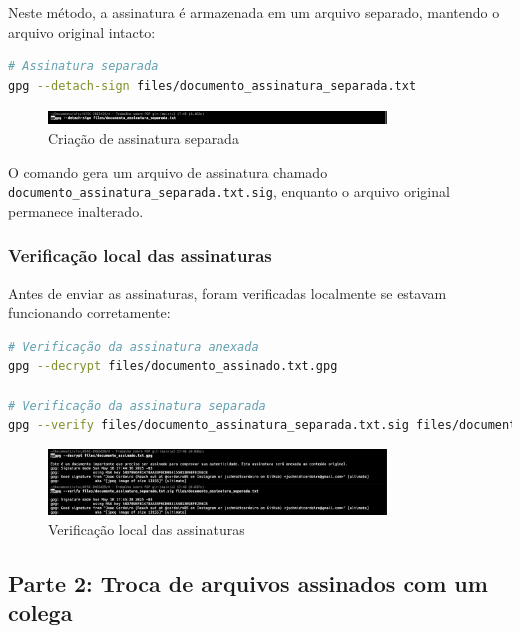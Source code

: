 Neste método, a assinatura é armazenada em um arquivo separado, mantendo o arquivo original intacto:

\begin{lstlisting}[language=bash]
# Assinatura separada
gpg --detach-sign files/documento_assinatura_separada.txt
\end{lstlisting}

\begin{figure}[htb]
    \centering
    \includegraphics[width=0.8\textwidth]{images/11-criacao_assinatura_separada.jpg}
    \caption{Criação de assinatura separada}
    \label{fig:criacao-assinatura-separada}
\end{figure}

O comando gera um arquivo de assinatura chamado \texttt{documento\_assinatura\_separada.txt.sig}, enquanto o arquivo original permanece inalterado.

\subsubsection{Verificação local das assinaturas}

Antes de enviar as assinaturas, foram verificadas localmente se estavam funcionando corretamente:

\begin{lstlisting}[language=bash]
# Verificação da assinatura anexada
gpg --decrypt files/documento_assinado.txt.gpg

# Verificação da assinatura separada
gpg --verify files/documento_assinatura_separada.txt.sig files/documento_assinatura_separada.txt
\end{lstlisting}

\begin{figure}[htb]
    \centering
    \includegraphics[width=0.8\textwidth]{images/11-verificacao_local_assinaturas.jpg}
    \caption{Verificação local das assinaturas}
    \label{fig:verificacao-local-assinaturas}
\end{figure}

\subsection{Parte 2: Troca de arquivos assinados com um colega}

